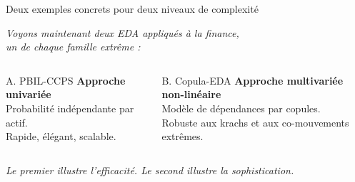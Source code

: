 \documentclass[10pt,aspectratio=169]{beamer}
\begin{document}
\begin{frame}{Deux exemples concrets pour deux niveaux de complexité}
\begin{center}
\textit{Voyons maintenant deux EDA appliqués à la finance,\\un de chaque famille extrême :}
\end{center}

\vspace{0.4cm}
\begin{columns}[T]
\begin{block}{A. PBIL-CCPS}
\centering
\textcolor{successgreen}{\textbf{Approche univariée}}\\[0.2cm]
Probabilité indépendante par actif.\\
Rapide, élégant, scalable.
\end{block}

\begin{block}{B. Copula-EDA}
\centering
\textcolor{dangerred}{\textbf{Approche multivariée non-linéaire}}\\[0.2cm]
Modèle de dépendances par copules.\\
Robuste aux krachs et aux co-mouvements extrêmes.
\end{block}
\end{columns}

\vspace{0.3cm}
\centering
\textit{Le premier illustre l'efficacité. Le second illustre la sophistication.}
\end{frame}
\end{document}

